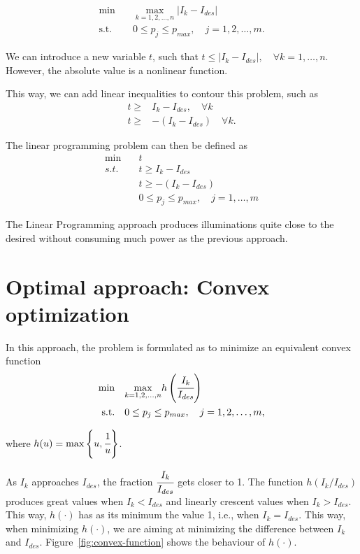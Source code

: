 \documentclass[11pt,a4paper]{article}
\begin{document}
\begin{align*}
    \min & \quad \underset{k=1, 2, \dots, n}{\max} \vert I_{k} - I_{des} \vert \\
    \text{s.t.} & \quad 0 \leq p_j \leq p_{max}, \quad j = 1, 2, \dots, m.
\end{align*}

We can introduce a new variable $t$, such that $t \leq |I_k - I_{des}|, \quad \forall k = 1, \dots, n $. However, the absolute value is a nonlinear function. 

This way, we can add linear inequalities to contour this problem, such as
\begin{align*}
    t \geq & I_k - I_{des}, \quad \forall k\\
    t \geq & -(I_k - I_{des}) \quad \forall k.
\end{align*}

The linear programming problem can then be defined as
\begin{align*}
    \min \quad & t\\
    s.t. \quad & t \geq I_k - I_{des} \\
               & t \geq -(I_k - I_{des}) \\
               & 0 \leq p_j \leq p_{max}, \quad j = 1, \dots, m
\end{align*}

The Linear Programming approach produces illuminations quite close to the desired without consuming much power as the previous approach. 

\section{Optimal approach: Convex optimization}

In this approach, the problem is formulated as to minimize an equivalent convex function 
\begin{align*}
    \min \quad &  \underset{k = 1, 2, \dots, n}{\max} h\left(\cfrac{I_k}{I_{des}}\right) \\
    \text{s.t.} \quad & 0 \leq p_j \leq p_{max}, \quad j = 1, 2, \dots, m,
\end{align*}

where $h(u) = \max\left\{u, \cfrac{1}{u}\right\}$.

As $I_k$ approaches $I_{des}$, the fraction $\cfrac{I_k}{I_{des}}$ gets closer to 1. The function $h(I_k/I_{des})$ produces great values when $I_k < I_{des}$ and linearly crescent values when $I_k > I_{des}$. This way, $h(\cdot)$ has as its minimum the value 1, i.e., when $I_k = I_{des}$. This way, when minimizing $h(\cdot)$, we are aiming at minimizing the difference between $I_k$ and $I_{des}$. Figure~\ref{fig:convex-function} shows the behaviour of $h(\cdot)$.
\end{document}
